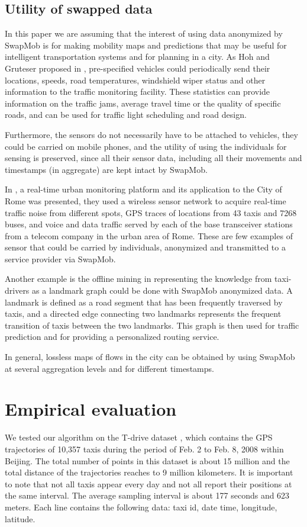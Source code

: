 \documentclass{llncs}
\begin{document}
 
\subsection{Utility of swapped data}\label{sect:util}
In this paper we are assuming that the interest of using data anonymized by SwapMob is for making mobility maps and predictions that may be useful for intelligent transportation systems and for planning in a city. 
As Hoh and Gruteser proposed in \cite{Hoh2005}, pre-specified vehicles could periodically send their locations, speeds, road temperatures, windshield wiper status and other information to the traffic monitoring facility. These statistics can provide information on the traffic jams, average travel time or the quality of specific roads, and can be used for traffic light scheduling and road design. 

Furthermore, the sensors do not necessarily have to be attached to vehicles, they could be carried on mobile phones, and the utility of using the individuals for sensing is preserved, since all their sensor data, including all their movements and timestamps (in aggregate) are kept intact by SwapMob.


In \cite{Calabrese2011}, a real-time urban monitoring platform and its application to the City of Rome was presented, they used 
a wireless sensor network to acquire real-time traffic noise from different spots, GPS traces of locations from 43 taxis and 7268 buses, and voice and data traffic served by each of the base transceiver stations from a telecom company in the urban area of Rome. These are few examples of sensor that could be carried by individuals, anonymized and transmitted to a service provider via SwapMob.


Another example is the offline mining in \cite{Yuan2011} representing the knowledge from taxi-drivers as a landmark graph could be done with SwapMob anonymized data. A landmark is defined as a road segment that has been frequently traversed by taxis, and a directed edge connecting two landmarks represents the frequent transition of taxis between the two landmarks. This graph is then used for traffic prediction and for providing a personalized routing service.


In general, lossless maps of flows in the city can be obtained by using SwapMob at several aggregation levels and for different timestamps.



\section{Empirical evaluation}
We tested our algorithm on the T-drive dataset \cite{Yuan2010},\cite{Yuan2011} which contains the GPS trajectories of 10,357 taxis during the period of Feb. 2 to Feb. 8, 2008 within Beijing. The total number of points in this dataset is about 15 million and the total distance of the trajectories reaches to 9 million kilometers.
It is important to note that not all taxis appear every day and not all report their positions at the same interval.
The average sampling interval is about 177 seconds and 623 meters. 
Each line contains the following data: taxi id, date time, longitude, latitude.
\end{document}
